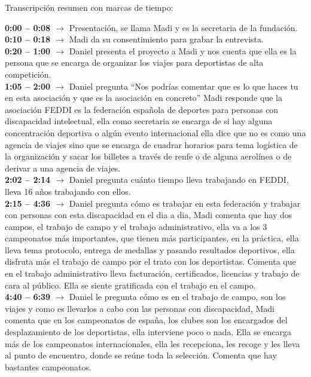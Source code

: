 Transcripción resumen con marcas de tiempo:

\noindent\textbf{0:00 -- 0:08 $\rightarrow$} Presentación, se llama Madi y es la secretaria de la fundación. \\
\textbf{0:10 -- 0:18 $\rightarrow$} Madi da su consentimiento para grabar la entrevista. \\
\textbf{0:20 -- 1:00 $\rightarrow$} Daniel presenta el proyecto a Madi y nos cuenta que ella es la persona que se encarga de organizar los viajes para deportistas de alta competición. \\
\textbf{1:05 -- 2:00 $\rightarrow$} Daniel pregunta “Nos podrías comentar que es lo que haces tu en esta asociación y que es la asociación en concreto” Madi responde que la asociación FEDDI es la federación española de deportes para personas con discapacidad intelectual, ella como secretaria se encarga de si hay alguna concentración deportiva o algún evento internacional ella dice que no es como una agencia de viajes sino que se encarga de cuadrar horarios para tema logística de la organización y sacar los billetes a través de renfe o de alguna aerolínea o de derivar a una agencia de viajes. \\
\textbf{2:02 -- 2:14 $\rightarrow$} Daniel pregunta cuánto tiempo lleva trabajando en FEDDI, lleva 16 años trabajando con ellos. \\
\textbf{2:15 -- 4:36 $\rightarrow$} Daniel pregunta cómo es trabajar en esta federación y trabajar con personas con esta discapacidad en el dia a dia, Madi comenta que hay dos campos, el trabajo de campo y el trabajo administrativo, ella va a los 3 campeonatos más importantes, que tienen más participantes, en la práctica, ella lleva tema protocolo, entrega de medallas y pasando resultados deportivos, ella disfruta más el trabajo de campo por el trato con los deportistas. Comenta que en el trabajo administrativo lleva facturación, certificados, licencias y trabajo de cara al público. Ella se siente gratificada con el trabajo en el campo. \\
\textbf{4:40 -- 6:39 $\rightarrow$} Daniel le pregunta cómo es en el trabajo de campo, son los viajes y como es llevarlos a cabo con las personas con discapacidad, Madi comenta que en los campeonatos de españa, los clubes son los encargados del desplazamiento de los deportistas, ella interviene poco o nada. Ella se encarga más de los campeonatos internacionales, ella les recepciona, les recoge y les lleva al punto de encuentro, donde se reúne toda la selección. Comenta que hay bastantes campeonatos. \\
